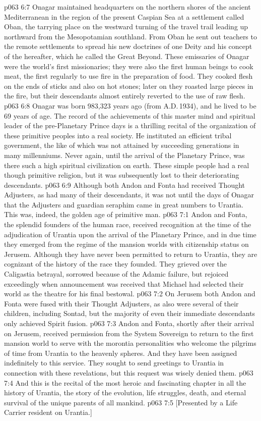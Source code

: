 \vs p063 6:7 \pc Onagar maintained headquarters on the northern shores of the ancient Mediterranean in the region of the present Caspian Sea at a settlement called Oban, the tarrying place on the westward turning of the travel trail leading up northward from the Mesopotamian southland. From Oban he sent out teachers to the remote settlements to spread his new doctrines of one Deity and his concept of the hereafter, which he called the Great Beyond. These emissaries of Onagar were the world’s first missionaries; they were also the first human beings to cook meat, the first regularly to use fire in the preparation of food. They cooked flesh on the ends of sticks and also on hot stones; later on they roasted large pieces in the fire, but their descendants almost entirely reverted to the use of raw flesh.
\vs p063 6:8 Onagar was born 983,323 years ago (from A.D.\,1934), and he lived to be 69 years of age. The record of the achievements of this master mind and spiritual leader of the pre\hyp{}Planetary Prince days is a thrilling recital of the organization of these primitive peoples into a real society. He instituted an efficient tribal government, the like of which was not attained by succeeding generations in many millenniums. Never again, until the arrival of the Planetary Prince, was there such a high spiritual civilization on earth. These simple people had a real though primitive religion, but it was subsequently lost to their deteriorating descendants.
\vs p063 6:9 Although both Andon and Fonta had received Thought Adjusters, as had many of their descendants, it was not until the days of Onagar that the Adjusters and guardian seraphim came in great numbers to Urantia. This was, indeed, the golden age of primitive man.
\vs p063 7:1 Andon and Fonta, the splendid founders of the human race, received recognition at the time of the adjudication of Urantia upon the arrival of the Planetary Prince, and in due time they emerged from the regime of the mansion worlds with citizenship status on Jerusem. Although they have never been permitted to return to Urantia, they are cognizant of the history of the race they founded. They grieved over the Caligastia betrayal, sorrowed because of the Adamic failure, but rejoiced exceedingly when announcement was received that Michael had selected their world as the theatre for his final bestowal.
\vs p063 7:2 On Jerusem both Andon and Fonta were fused with their Thought Adjusters, as also were several of their children, including Sontad, but the majority of even their immediate descendants only achieved Spirit fusion.
\vs p063 7:3 Andon and Fonta, shortly after their arrival on Jerusem, received permission from the System Sovereign to return to the first mansion world to serve with the morontia personalities who welcome the pilgrims of time from Urantia to the heavenly spheres. And they have been assigned indefinitely to this service. They sought to send greetings to Urantia in connection with these revelations, but this request was wisely denied them.
\vs p063 7:4 \pc And this is the recital of the most heroic and fascinating chapter in all the history of Urantia, the story of the evolution, life struggles, death, and eternal survival of the unique parents of all mankind.
\vsetoff
\vs p063 7:5 [Presented by a Life Carrier resident on Urantia.]
\quizlink
